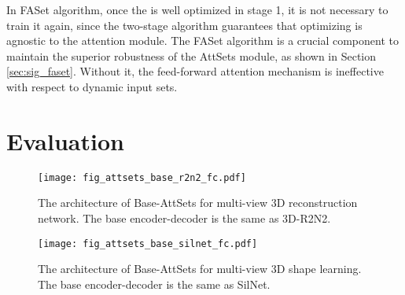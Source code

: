 \documentclass[twocolumn]{svjour3}    \pdfoutput=1
\newcommand{\nickname}{AttSets}
\newcommand{\faset}{FASet}
\newcommand{\rev}{}
\begin{document}
\rev{In \faset{} algorithm, once the}  \rev{is well optimized in stage 1, it is not necessary to train it again, since the two-stage algorithm guarantees that optimizing}  \rev{is agnostic to the attention module. The \faset{} algorithm is a crucial component to maintain the superior robustness of the \nickname{} module, as shown in Section} \ref{sec:sig_faset}. \rev{Without it, the feed-forward attention mechanism is ineffective with respect to dynamic input sets.}

\section{Evaluation}
\begin{figure}[t]
\centering
   \texttt{[image: fig\_attsets\_base\_r2n2\_fc.pdf]}
\caption{The architecture of Base-AttSets for multi-view 3D reconstruction network. The base encoder-decoder is the same as 3D-R2N2.}
\label{fig:fig_attsets_base_r2n2_fc}
\vspace{-0.15cm}
\end{figure}

\begin{figure}[t]
\centering
   \texttt{[image: fig\_attsets\_base\_silnet\_fc.pdf]}
\caption{The architecture of Base-AttSets for multi-view 3D shape learning. The base encoder-decoder is the same as SilNet.}
\label{fig:fig_attsets_base_silnet_fc}
\vspace{-0.35cm}
\end{figure}
\end{document}
